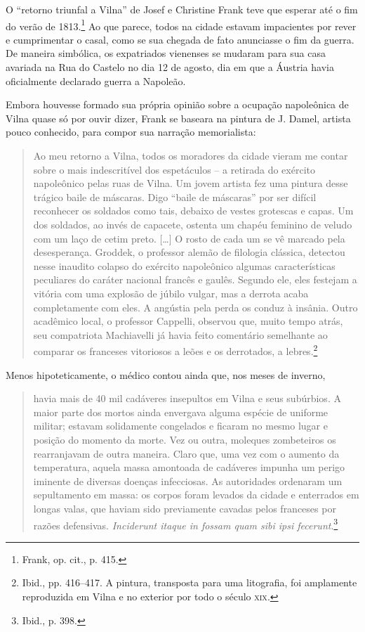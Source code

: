 \asterisc

O ``retorno triunfal a Vilna'' de Josef e Christine Frank teve que
esperar até o fim do verão de 1813.\footnote{Frank, op. cit., p. 415.}
Ao que parece, todos na cidade estavam impacientes por rever e
cumprimentar o casal, como se sua chegada de fato anunciasse o fim da
guerra. De maneira simbólica, os expatriados vienenses se mudaram para
sua casa avariada na Rua do Castelo no dia 12 de agosto, dia em que a
Áustria havia oficialmente declarado guerra a Napoleão.

Embora houvesse formado sua própria opinião sobre a ocupação napoleônica
de Vilna quase só por ouvir dizer, Frank se baseara na pintura de J.
Damel, artista pouco conhecido, para compor sua narração memorialista:

\begin{quote}
Ao meu retorno a Vilna, todos os moradores da cidade vieram me contar
sobre o mais indescritível dos espetáculos -- a retirada do exército
napoleônico pelas ruas de Vilna. Um jovem artista fez uma pintura desse
trágico baile de máscaras. Digo ``baile de máscaras'' por ser difícil
reconhecer os soldados como tais, debaixo de vestes grotescas e capas.
Um dos soldados, ao invés de capacete, ostenta um chapéu feminino de
veludo com um laço de cetim preto. [\ldots{}] O rosto de cada um se vê
marcado pela desesperança. Groddek, o professor alemão de
filologia clássica, detectou nesse inaudito colapso do exército
napoleônico algumas características peculiares do caráter nacional
francês e gaulês. Segundo ele, eles festejam a vitória com uma explosão
de júbilo vulgar, mas a derrota acaba completamente com eles. A angústia
pela perda os conduz à insânia. Outro acadêmico local, o professor
Cappelli, observou que, muito tempo atrás, seu compatriota Machiavelli
já havia feito comentário semelhante ao comparar os franceses vitoriosos
a leões e os derrotados, a lebres.\footnote{Ibid., pp. 416--417. A pintura, transposta para uma litografia, foi amplamente reproduzida em Vilna e no exterior por todo o século \textsc{xix}.} 
\end{quote}

Menos hipoteticamente, o médico contou ainda que, nos meses de inverno,

\begin{quote}
havia mais de 40 mil cadáveres insepultos em Vilna e seus subúrbios. A
maior parte dos mortos ainda envergava alguma espécie de uniforme
militar; estavam solidamente congelados e ficaram no mesmo lugar e
posição do momento da morte. Vez ou outra, moleques zombeteiros os
rearranjavam de outra maneira. Claro que, uma vez com o aumento da
temperatura, aquela massa amontoada de cadáveres impunha um perigo
iminente de diversas doenças infecciosas. As autoridades ordenaram um
sepultamento em massa: os corpos foram levados da cidade e enterrados em
longas valas, que haviam sido previamente cavadas pelos franceses por
razões defensivas. \textit{Inciderunt itaque in fossam quam sibi ipsi
fecerunt}.\footnote{Ibid., p. 398.}
\end{quote}

